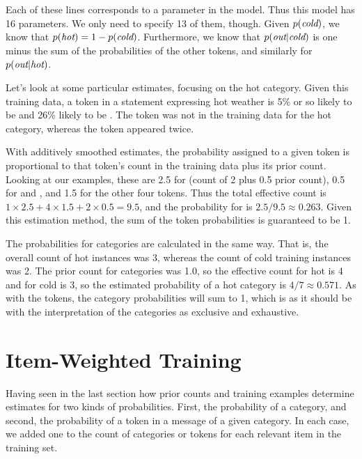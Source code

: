 Each of these lines corresponds to a parameter in the model.  Thus
this model has 16 parameters.  We only need to specify 13 of them,
though.  Given $p(\mbox{\it cold})$, we know that
$p(\mbox{\it hot}) = 1 - p(\mbox{\it cold})$.  Furthermore,
we know that $p(\mbox{\it out}|\mbox{\it cold})$ is one
minus the sum of the probabilities of the other tokens, and similarly
for $p(\mbox{\it out}|\mbox{\it hot})$.

Let's look at some particular estimates, focusing on the hot category.
Given this training data, a token in a statement expressing hot
weather is 5\% or so likely to be  and 26\% likely
to be .  The token  was
not in the training data for the hot category, whereas the token
 appeared twice.  

With additively smoothed estimates, the probability assigned to a
given token is proportional to that token's count in the training data
plus its prior count.  Looking at our examples, these are 2.5 for
 (count of 2 plus 0.5 prior count), 0.5 for
 and , and 1.5 for the
other four tokens.  Thus the total effective count is $1 \times 2.5 +
4 \times 1.5 + 2 \times 0.5 = 9.5$, and the probability for
 is $2.5/9.5 \approx 0.263$.  Given this
estimation method, the sum of the token probabilities is guaranteed to
be 1.

The probabilities for categories are calculated in the same way.  That
is, the overall count of hot instances was 3, whereas the count of
cold training instances was 2.  The prior count for categories was
1.0, so the effective count for hot is 4 and for cold is 3, so the
estimated probability of a hot category is $4/7 \approx 0.571$.  As
with the tokens, the category probabilities will sum to 1, which is as
it should be with the interpretation of the categories as exclusive
and exhaustive.



\section{Item-Weighted Training}

Having seen in the last section how prior counts and training examples
determine estimates for two kinds of probabilities.  First, the probability
of a category, and second, the probability of a token in a message of
a given category.  In each case, we added one to the count of categories
or tokens for each relevant item in the training set.

